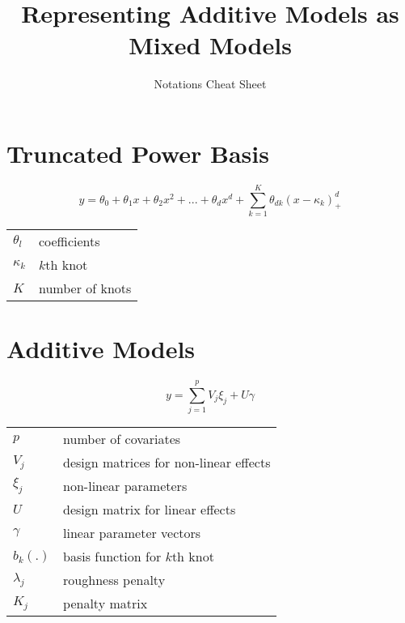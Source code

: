\documentclass{article}
\title{Representing Additive Models as Mixed Models}
\author{Notations Cheat Sheet}
\date{}
\begin{document}
\def\arraystretch{1.3}
\maketitle
\vspace{2em}
\begin{multicols}{2}
%


\section*{Truncated Power Basis}

$$y = \theta_0 + \theta_1x + \theta_2x^2 + ... + \theta_dx^d + \sum_{k=1}^K \theta_{dk}(x-\kappa_k)_+^d $$

\begin{tabular}{l l}
$\theta_l$ & coefficients \\
$\kappa_k$ & $k$th knot \\
$K$ & number of knots \\
\end{tabular}

\section*{Additive Models}

$$y = \sum_{j=1}^p V_j\xi_j + U\gamma$$

\begin{tabular}{l l}
$p$ & number of covariates \\
$V_j$ & design matrices for non-linear effects \\
$\xi_j$ & non-linear parameters \\
$U$ & design matrix for linear effects \\
$\gamma$ & linear parameter vectors \\
$b_k(.)$ & basis function for $k$th knot \\
$\lambda_j$ & roughness penalty \\
$K_j$ & penalty matrix \\
\end{tabular}


\end{multicols}
\end{document}
